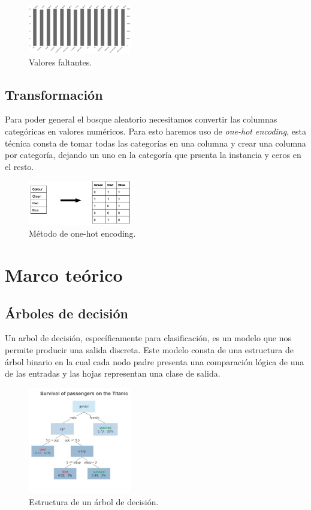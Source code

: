 \documentclass[twocolumn]{article}
\begin{document}
\begin{figure}[!h]
\centering
\includegraphics[width=0.4\textwidth]{assets/missing.png}
\caption{\label{fig:missing}Valores faltantes.}
\end{figure}

\subsection{Transformación}
Para poder general el bosque aleatorio necesitamos convertir las columnas categóricas
en valores numéricos. Para esto haremos uso de \textit{one-hot encoding}, esta técnica
consta de tomar todas las categorías en una columna y crear una columna por categoría, 
dejando un uno en la categoría que prsenta la instancia y ceros en el resto.

\begin{figure}[!h]
\centering
\includegraphics[width=0.4\textwidth]{assets/onehot.png}
\caption{\label{fig:onehot}Método de one-hot encoding.}
\end{figure}

\section{Marco teórico}
\subsection{Árboles de decisión}
Un arbol de decisión, específicamente para clasificación, es un modelo que nos 
permite producir una salida discreta. Este modelo consta de una estructura de árbol
binario en la cual cada nodo padre presenta una comparación lógica de una de las entradas
y las hojas representan una clase de salida.

\begin{figure}[!h]
\centering
\includegraphics[width=0.4\textwidth]{assets/Decision_Tree.jpg}
\caption{\label{fig:dt}Estructura de un árbol de decisión.}
\end{figure}
\end{document}
